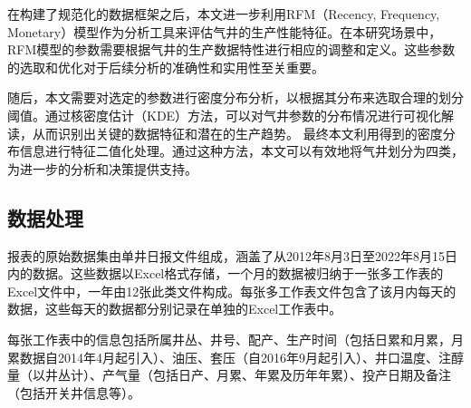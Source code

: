在构建了规范化的数据框架之后，本文进一步利用RFM（Recency, Frequency, Monetary）模型作为分析工具来评估气井的生产性能特征。在本研究场景中，RFM模型的参数需要根据气井的生产数据特性进行相应的调整和定义。这些参数的选取和优化对于后续分析的准确性和实用性至关重要。

随后，本文需要对选定的参数进行密度分布分析，以根据其分布来选取合理的划分阈值。通过核密度估计（KDE）方法，可以对气井参数的分布情况进行可视化解读，从而识别出关键的数据特征和潜在的生产趋势。
最终本文利用得到的密度分布信息进行特征二值化处理。通过这种方法，本文可以有效地将气井划分为四类，为进一步的分析和决策提供支持。
\subsection{数据处理}
\label{cha:data}
报表的原始数据集由单井日报文件组成，涵盖了从2012年8月3日至2022年8月15日内的数据。这些数据以Excel格式存储，一个月的数据被归纳于一张多工作表的Excel文件中，一年由12张此类文件构成。每张多工作表文件包含了该月内每天的数据，这些每天的数据都分别记录在单独的Excel工作表中。

每张工作表中的信息包括所属井丛、井号、配产、生产时间（包括日累和月累，月累数据自2014年4月起引入）、油压、套压（自2016年9月起引入）、井口温度、注醇量（以井丛计）、产气量（包括日产、月累、年累及历年年累）、投产日期及备注（包括开关井信息等）。

